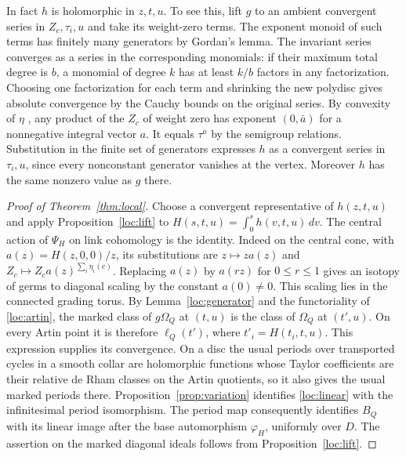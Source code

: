 In fact $h$ is holomorphic in $z,t,u$. To see this, lift $g$ to an
ambient convergent series in $Z_c,\tau_i,u$ and take its weight-zero
terms. The exponent monoid of such terms has finitely many generators
by Gordan's lemma. The invariant series converges as a series in
the corresponding monomials: if their maximum total degree is $b$,
a monomial of degree $k$ has at least $k/b$ factors in any
factorization. Choosing one factorization for each term and shrinking
the new polydisc gives absolute convergence by the Cauchy bounds on
the original series. By convexity of $\eta$ \cite[\S4.5(iii)]{Alt},
any product of the $Z_c$ of weight zero has exponent $(0,\bar a)$
for a nonnegative integral vector $a$. It equals $\tau^a$ by the
semigroup relations. Substitution in the finite set of generators
expresses $h$ as a convergent series in $\tau_i,u$, since every
nonconstant generator vanishes at the vertex. Moreover $h$ has the
same nonzero value as $g$ there.

\begin{proof}[Proof of Theorem~\ref{thm:local}]
Choose a convergent representative of $h(z,t,u)$ and apply
Proposition~\ref{loc:lift} to
$H(s,t,u)=\int_0^s h(v,t,u)\,dv$.
The central action of $\Psi_H$ on link cohomology is the identity.
Indeed on the central cone, with $a(z)=H(z,0,0)/z$, its substitutions
are $z\mapsto za(z)$ and $Z_c\mapsto Z_c a(z)^{\sum_i\eta_i(c)}$.
Replacing $a(z)$ by $a(rz)$ for $0\leq r\leq1$ gives an isotopy of
germs to diagonal scaling by the constant $a(0)\ne0$. This scaling
lies in the connected grading torus. By Lemma~\ref{loc:generator} and
the functoriality of \eqref{loc:artin}, the marked class of $g\Omega_Q$
at $(t,u)$ is the class of $\Omega_Q$ at $(t',u)$. On every Artin
point it is therefore $\ell_Q(t')$, where $t'_i=H(t_i,t,u)$.
This expression supplies its convergence. On a disc the usual periods
over transported cycles in a smooth collar are holomorphic functions
whose Taylor coefficients are their relative de Rham classes on the
Artin quotients, so it also gives the usual marked periods there.
Proposition~\ref{prop:variation} identifies \eqref{loc:linear} with
the infinitesimal period isomorphism. The period map consequently
identifies $B_Q$ with its linear image after the base automorphism
$\varphi_H$, uniformly over $D$. The assertion on the marked diagonal
ideals follows from Proposition~\ref{loc:lift}.
\end{proof}
